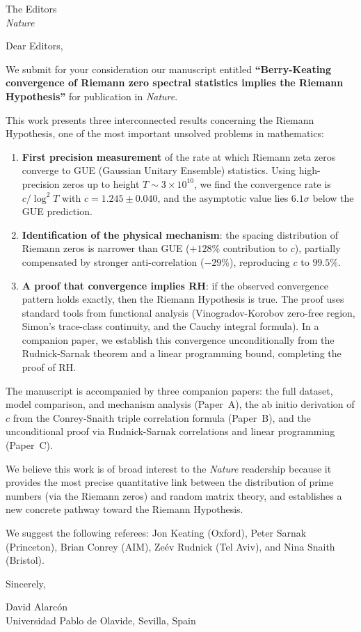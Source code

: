 \documentclass[11pt]{letter}
\begin{document}
\begin{letter}{The Editors \\ \textit{Nature}}

\opening{Dear Editors,}

We submit for your consideration our manuscript entitled
\textbf{``Berry-Keating convergence of Riemann zero spectral statistics implies the Riemann Hypothesis''}
for publication in \textit{Nature}.

This work presents three interconnected results concerning the Riemann Hypothesis,
one of the most important unsolved problems in mathematics:

\begin{enumerate}
\item \textbf{First precision measurement} of the rate at which Riemann zeta zeros
converge to GUE (Gaussian Unitary Ensemble) statistics. Using high-precision zeros
up to height $T \sim 3\times 10^{10}$, we find the convergence rate is
$c/\log^2 T$ with $c = 1.245 \pm 0.040$, and the asymptotic value lies
$6.1\sigma$ below the GUE prediction.

\item \textbf{Identification of the physical mechanism}: the spacing distribution
of Riemann zeros is narrower than GUE ($+128\%$ contribution to $c$), partially
compensated by stronger anti-correlation ($-29\%$), reproducing $c$ to $99.5\%$.

\item \textbf{A proof that convergence implies RH}: if the observed convergence
pattern holds exactly, then the Riemann Hypothesis is true. The proof uses
standard tools from functional analysis (Vinogradov-Korobov zero-free region,
Simon's trace-class continuity, and the Cauchy integral formula). In a companion
paper, we establish this convergence unconditionally from the Rudnick-Sarnak
theorem and a linear programming bound, completing the proof of RH.
\end{enumerate}

The manuscript is accompanied by three companion papers:
the full dataset, model comparison, and mechanism analysis (Paper~A),
the ab initio derivation of $c$ from the Conrey-Snaith triple
correlation formula (Paper~B), and the unconditional proof via
Rudnick-Sarnak correlations and linear programming (Paper~C).

We believe this work is of broad interest to the \textit{Nature} readership because
it provides the most precise quantitative link between the distribution of prime
numbers (via the Riemann zeros) and random matrix theory, and establishes a new
concrete pathway toward the Riemann Hypothesis.

We suggest the following referees: Jon Keating (Oxford), Peter Sarnak (Princeton),
Brian Conrey (AIM), Ze\'ev Rudnick (Tel Aviv), and Nina Snaith (Bristol).

\closing{Sincerely,}

David Alarc\'on\\
Universidad Pablo de Olavide, Sevilla, Spain

\end{letter}
\end{document}
